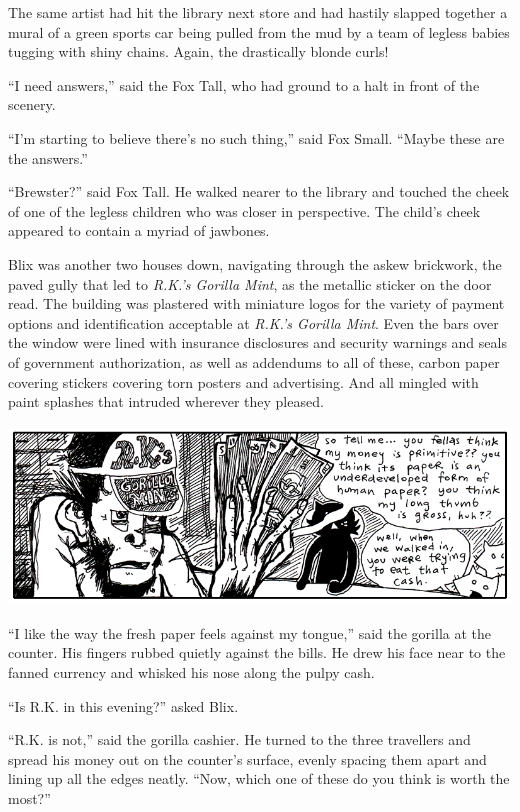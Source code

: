 \documentclass[10pt,twoside]{report}
\begin{document}
The same artist had hit the library next store and had hastily slapped
together a mural of a green sports car being pulled from the mud by a
team of legless babies tugging with shiny chains. Again, the
drastically blonde curls!

``I need answers,'' said the Fox Tall, who had ground to a halt in
front of the scenery.

``I'm starting to believe there's no such thing,'' said Fox Small.
``Maybe these are the answers.''

``Brewster?'' said Fox Tall.  He walked nearer to the library and
touched the cheek of one of the legless children who was closer in
perspective.  The child's cheek appeared to contain a myriad of
jawbones.

Blix was another two houses down, navigating through the askew
brickwork, the paved gully that led to {\em R.K.'s Gorilla Mint}, as
the metallic sticker on the door read.  The building was plastered
with miniature logos for the variety of payment options and
identification acceptable at {\em R.K.'s Gorilla Mint}.  Even the bars
over the window were lined with insurance disclosures and security
warnings and seals of government authorization, as well as addendums
to all of these, carbon paper covering stickers covering torn posters
and advertising.  And all mingled with paint splashes that intruded
wherever they pleased.

	\includegraphics[width=1.0\textwidth]{cache/72.png}

``I like the way the fresh paper feels against my tongue,'' said the
        gorilla at the counter. His fingers rubbed quietly against the
        bills.  He drew his face near to the fanned currency and
        whisked his nose along the pulpy cash.

``Is R.K. in this evening?'' asked Blix.

``R.K. is not,'' said the gorilla cashier.  He turned to the three
        travellers and spread his money out on the counter's surface,
        evenly spacing them apart and lining up all the edges neatly.
        ``Now, which one of these do you think is worth the most?''
\end{document}
